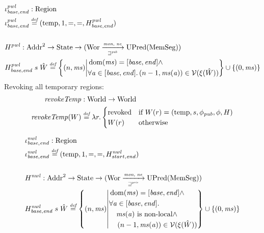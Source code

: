 \documentclass[compsoc,conference,letterpaper,fleqn]{IEEEtran}
\newcommand{\fun}{\rightarrow}
\newcommand{\defeq}{\stackrel{\textit{\tiny{def}}}{=}}
\newcommand{\union}{\mathbin{\cup}}
\DeclareMathOperator{\dom}{dom}
\newcommand{\var}[1]{\mathit{#1}}
\newcommand{\hs}{\var{ms}}
\newcommand{\ms}{\hs}
\newcommand{\addr}{\var{a}}
\newcommand{\start}{\var{base}}
\newcommand{\addrend}{\var{end}}
\newcommand{\nwl}{\var{nwl}}
\newcommand{\pwl}{\var{pwl}}
\newcommand{\plainfun}[2]{
  \ifthenelse{\equal{#2}{}}
  {\mathit{#1}}
  {\mathit{#1}(#2)}
}
\newcommand{\revokeTemp}[1]{\plainfun{revokeTemp}{#1}}
\newcommand{\pub}{\var{pub}}
\newcommand{\futurewk}{\mathbin{\sqsupseteq}^{\var{pub}}}
\newcommand{\futurestr}{\mathbin{\sqsupseteq}^{\var{priv}}}
\newcommand{\monwknefun}{\xrightarrow[\text{\tiny{$\futurewk$}}]{\textit{\tiny{mon, ne}}}}
\newcommand{\monstrnefun}{\xrightarrow[\text{\tiny{$\futurestr$}}]{\textit{\tiny{mon, ne}}}}
\newcommand{\asmType}{\plaindom{AsmType}}
\newcommand{\plaindom}[1]{\mathrm{#1}}
\newcommand{\Addrs}{\plaindom{Addr}}
\newcommand{\HeapSegments}{\plaindom{MemSeg}}
\newcommand{\States}{\plaindom{State}}
\newcommand{\Regions}{\plaindom{Region}}
\newcommand{\Worlds}{\plaindom{World}}
\newcommand{\Wor}{\plaindom{Wor}}
\newcommand{\UPred}[1]{\plaindom{UPred}(#1)}
\newcommand{\intr}[2]{\mathcal{#1}}
\newcommand{\valueintr}[1]{\intr{V}{#1}}
\newcommand{\stdvr}{\valueintr{\asmType}}
\newcommand{\npair}[2][n]{\left(#1,#2 \right)}
\newcommand{\plainview}[1]{\mathrm{#1}}
\newcommand{\temp}{\plainview{temp}}
\newcommand{\revoked}{\plainview{revoked}}
\newcommand{\nonlocal}[1]{\ensuremath{#1} \text{ is non-local}}
\begin{document}
\begin{align*}
  &\iota_{\start,\addrend}^\pwl : \Regions\\
  &\iota_{\start,\addrend}^\pwl \defeq (\temp,1,=,=,H^\pwl_{\start,\addrend}) \\
  \\
  &H^\pwl : \Addrs^2 \fun \States \fun (\Wor \monwknefun \UPred{\HeapSegments})\\
  &H^\pwl_{\start,\addrend}\; s \; \hat{W} \defeq \left\{\npair{\hs} \middle|
    \begin{aligned}
      &\dom(\hs) = [\start,\addrend] \land \\
      &\forall \addr \in [\start,\addrend] \ldotp \npair[n-1]{\hs(\addr)} \in \stdvr(\xi(\hat{W}))
    \end{aligned}
        \right\} \union \{\npair[0]{\ms} \}
\end{align*}
Revoking all temporary regions:
\begin{align*}
  \revokeTemp{} & : \Worlds \fun \Worlds \\
  \revokeTemp{W} & \defeq \lambda r \ldotp 
                   \begin{cases}
                     \revoked            & \text{if }W(r) = (\temp,s,\phi_\pub,\phi,H) \\
                     W(r)                & \text{otherwise}
                   \end{cases}
\end{align*}
\newcommand{\wrev}[1]{\revokeTemp{#1}}

\begin{align*}
  &\iota_{\start,\addrend}^{\nwl} : \Regions \\
  &\iota_{\start,\addrend}^{\nwl} \defeq (\temp,1,=,=,H^\nwl_{start,\addrend}) \\
  \\
  &H^\nwl : \Addrs^2 \fun \States \fun (\Wor \monstrnefun \UPred{\HeapSegments})\\
  &H^\nwl_{\start,\addrend} \; s \;\hat{W} \defeq \left\{\npair{\hs} \middle|
    \begin{aligned}
      &\dom(\hs) = [\start,\addrend] \land \\
      &\forall \addr \in [\start,\addrend] \ldotp \\
      &\quad \nonlocal{\ms(\addr)} \land\\ 
      &\quad \npair[n-1]{\hs(\addr)} \in \stdvr(\xi(\hat{W}))
    \end{aligned}
        \right\} \union \{\npair[0]{\ms} \}
\end{align*}
\end{document}
